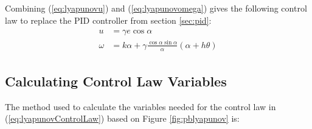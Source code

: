 Combining (\ref{eq:lyapunovu}) and (\ref{eq:lyapunovomega}) gives the following control law to replace the PID controller from section \ref{sec:pid}:
\begin{align}
\label{eq:lyapunovControlLaw}
\begin{split}
u &= \gamma e\cos\alpha \\
\omega &= k\alpha + \gamma\frac{\cos\alpha\sin\alpha}{\alpha}\left(\alpha+h\theta\right)
\end{split}
\end{align}

\subsection{Calculating Control Law Variables}
\label{sec:lyapunovVariables}
The method used to calculate the variables needed for the control law in (\ref{eq:lyapunovControlLaw}) based on Figure \ref{fig:pblyapunov} is:
